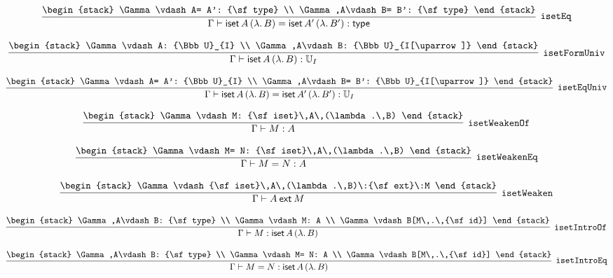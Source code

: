 \[
\infer[{\tt isetEq}]{\Gamma \vdash {\sf iset}\,A\,(\lambda .\,B)= {\sf iset}\,A'\,(\lambda .\,B'): {\sf type}}{
\begin{stack}
\Gamma \vdash A= A': {\sf type}
\\
\Gamma ,A\vdash B= B': {\sf type}
\end{stack}}
\]

\[
\infer[{\tt isetFormUniv}]{\Gamma \vdash {\sf iset}\,A\,(\lambda .\,B): {\Bbb U}_{I}}{
\begin{stack}
\Gamma \vdash A: {\Bbb U}_{I}
\\
\Gamma ,A\vdash B: {\Bbb U}_{I[\uparrow ]}
\end{stack}}
\]

\[
\infer[{\tt isetEqUniv}]{\Gamma \vdash {\sf iset}\,A\,(\lambda .\,B)= {\sf iset}\,A'\,(\lambda .\,B'): {\Bbb U}_{I}}{
\begin{stack}
\Gamma \vdash A= A': {\Bbb U}_{I}
\\
\Gamma ,A\vdash B= B': {\Bbb U}_{I[\uparrow ]}
\end{stack}}
\]

\[
\infer[{\tt isetWeakenOf}]{\Gamma \vdash M: A}{
\begin{stack}
\Gamma \vdash M: {\sf iset}\,A\,(\lambda .\,B)
\end{stack}}
\]

\[
\infer[{\tt isetWeakenEq}]{\Gamma \vdash M= N: A}{
\begin{stack}
\Gamma \vdash M= N: {\sf iset}\,A\,(\lambda .\,B)
\end{stack}}
\]

\[
\infer[{\tt isetWeaken}]{\Gamma \vdash A\:{\sf ext}\:M}{
\begin{stack}
\Gamma \vdash {\sf iset}\,A\,(\lambda .\,B)\:{\sf ext}\:M
\end{stack}}
\]

\[
\infer[{\tt isetIntroOf}]{\Gamma \vdash M: {\sf iset}\,A\,(\lambda .\,B)}{
\begin{stack}
\Gamma ,A\vdash B: {\sf type}
\\
\Gamma \vdash M: A
\\
\Gamma \vdash B[M\,.\,{\sf id}]
\end{stack}}
\]

\[
\infer[{\tt isetIntroEq}]{\Gamma \vdash M= N: {\sf iset}\,A\,(\lambda .\,B)}{
\begin{stack}
\Gamma ,A\vdash B: {\sf type}
\\
\Gamma \vdash M= N: A
\\
\Gamma \vdash B[M\,.\,{\sf id}]
\end{stack}}
\]

